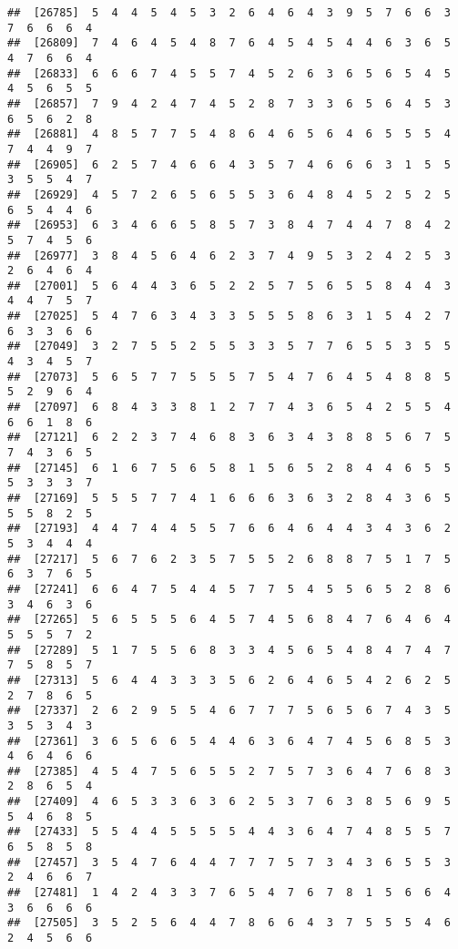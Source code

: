 \documentclass[
]{book}
\begin{document}
\begin{verbatim}
##  [26785]  5  4  4  5  4  5  3  2  6  4  6  4  3  9  5  7  6  6  3  7  6  6  6  4
##  [26809]  7  4  6  4  5  4  8  7  6  4  5  4  5  4  4  6  3  6  5  4  7  6  6  4
##  [26833]  6  6  6  7  4  5  5  7  4  5  2  6  3  6  5  6  5  4  5  4  5  6  5  5
##  [26857]  7  9  4  2  4  7  4  5  2  8  7  3  3  6  5  6  4  5  3  6  5  6  2  8
##  [26881]  4  8  5  7  7  5  4  8  6  4  6  5  6  4  6  5  5  5  4  7  4  4  9  7
##  [26905]  6  2  5  7  4  6  6  4  3  5  7  4  6  6  6  3  1  5  5  3  5  5  4  7
##  [26929]  4  5  7  2  6  5  6  5  5  3  6  4  8  4  5  2  5  2  5  6  5  4  4  6
##  [26953]  6  3  4  6  6  5  8  5  7  3  8  4  7  4  4  7  8  4  2  5  7  4  5  6
##  [26977]  3  8  4  5  6  4  6  2  3  7  4  9  5  3  2  4  2  5  3  2  6  4  6  4
##  [27001]  5  6  4  4  3  6  5  2  2  5  7  5  6  5  5  8  4  4  3  4  4  7  5  7
##  [27025]  5  4  7  6  3  4  3  3  5  5  5  8  6  3  1  5  4  2  7  6  3  3  6  6
##  [27049]  3  2  7  5  5  2  5  5  3  3  5  7  7  6  5  5  3  5  5  4  3  4  5  7
##  [27073]  5  6  5  7  7  5  5  5  7  5  4  7  6  4  5  4  8  8  5  5  2  9  6  4
##  [27097]  6  8  4  3  3  8  1  2  7  7  4  3  6  5  4  2  5  5  4  6  6  1  8  6
##  [27121]  6  2  2  3  7  4  6  8  3  6  3  4  3  8  8  5  6  7  5  7  4  3  6  5
##  [27145]  6  1  6  7  5  6  5  8  1  5  6  5  2  8  4  4  6  5  5  5  3  3  3  7
##  [27169]  5  5  5  7  7  4  1  6  6  6  3  6  3  2  8  4  3  6  5  5  5  8  2  5
##  [27193]  4  4  7  4  4  5  5  7  6  6  4  6  4  4  3  4  3  6  2  5  3  4  4  4
##  [27217]  5  6  7  6  2  3  5  7  5  5  2  6  8  8  7  5  1  7  5  6  3  7  6  5
##  [27241]  6  6  4  7  5  4  4  5  7  7  5  4  5  5  6  5  2  8  6  3  4  6  3  6
##  [27265]  5  6  5  5  5  6  4  5  7  4  5  6  8  4  7  6  4  6  4  5  5  5  7  2
##  [27289]  5  1  7  5  5  6  8  3  3  4  5  6  5  4  8  4  7  4  7  7  5  8  5  7
##  [27313]  5  6  4  4  3  3  3  5  6  2  6  4  6  5  4  2  6  2  5  2  7  8  6  5
##  [27337]  2  6  2  9  5  5  4  6  7  7  7  5  6  5  6  7  4  3  5  3  5  3  4  3
##  [27361]  3  6  5  6  6  5  4  4  6  3  6  4  7  4  5  6  8  5  3  4  6  4  6  6
##  [27385]  4  5  4  7  5  6  5  5  2  7  5  7  3  6  4  7  6  8  3  2  8  6  5  4
##  [27409]  4  6  5  3  3  6  3  6  2  5  3  7  6  3  8  5  6  9  5  5  4  6  8  5
##  [27433]  5  5  4  4  5  5  5  5  4  4  3  6  4  7  4  8  5  5  7  6  5  8  5  8
##  [27457]  3  5  4  7  6  4  4  7  7  7  5  7  3  4  3  6  5  5  3  2  4  6  6  7
##  [27481]  1  4  2  4  3  3  7  6  5  4  7  6  7  8  1  5  6  6  4  3  6  6  6  6
##  [27505]  3  5  2  5  6  4  4  7  8  6  6  4  3  7  5  5  5  4  6  2  4  5  6  6

\end{verbatim}
\end{document}
